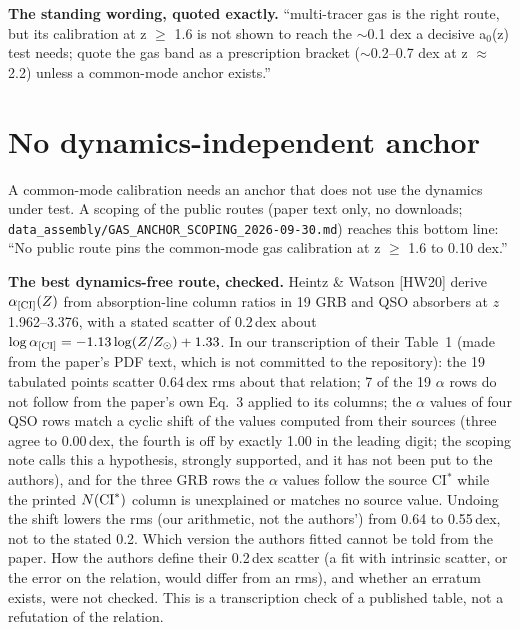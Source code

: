 \documentclass[10pt]{article}
\newcommand{\fpath}[1]{\nolinkurl{#1}}
\begin{document}
\textbf{The standing wording, quoted exactly.} ``multi-tracer gas is the right route, but its calibration at z $\ge$ 1.6 is not shown to reach the ${\sim}$0.1 dex a decisive a$_0$(z) test needs; quote the gas band as a prescription bracket (${\sim}$0.2--0.7 dex at z $\approx$ 2.2) unless a common-mode anchor exists.''

\section{No dynamics-independent anchor}\label{sec:anchor}

A common-mode calibration needs an anchor that does not use the dynamics under test. A scoping of the public routes (paper text only, no downloads; \fpath{data_assembly/GAS_ANCHOR_SCOPING_2026-09-30.md}) reaches this bottom line: ``No public route pins the common-mode gas calibration at z $\ge$ 1.6 to 0.10 dex.''

\textbf{The best dynamics-free route, checked.} Heintz \& Watson [HW20] derive $\alpha_{\rm [CI]}(Z)$ from absorption-line column ratios in 19 GRB and QSO absorbers at $z$ 1.962--3.376, with a stated scatter of 0.2\,dex about $\log\alpha_{\rm [CI]}=-1.13\log(Z/Z_\odot)+1.33$. In our transcription of their Table~1 (made from the paper's PDF text, which is not committed to the repository): the 19 tabulated points scatter 0.64\,dex rms about that relation; 7 of the 19 $\alpha$ rows do not follow from the paper's own Eq.~3 applied to its columns; the $\alpha$ values of four QSO rows match a cyclic shift of the values computed from their sources (three agree to 0.00\,dex, the fourth is off by exactly 1.00 in the leading digit; the scoping note calls this a hypothesis, strongly supported, and it has not been put to the authors), and for the three GRB rows the $\alpha$ values follow the source CI$^*$ while the printed $N({\rm CI}^*)$ column is unexplained or matches no source value. Undoing the shift lowers the rms (our arithmetic, not the authors') from 0.64 to 0.55\,dex, not to the stated 0.2. Which version the authors fitted cannot be told from the paper. How the authors define their 0.2\,dex scatter (a fit with intrinsic scatter, or the error on the relation, would differ from an rms), and whether an erratum exists, were not checked. This is a transcription check of a published table, not a refutation of the relation.
\end{document}
